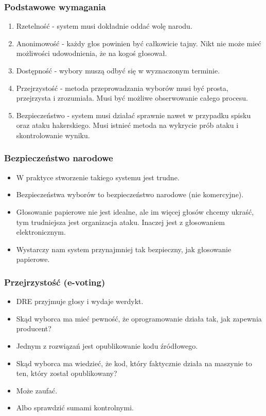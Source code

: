 \documentclass{beamer}
\begin{document}
\begin{frame}
\frametitle{Podstawowe wymagania}\pause
\begin{enumerate}
\item Rzetelność - system musi dokładnie oddać wolę narodu.\pause
\item Anonimowość - każdy głos powinien być całkowicie tajny. Nikt nie może mieć możliwości udowodnienia, że na kogoś głosował.\pause
\item Dostępność - wybory muszą odbyć się w wyznaczonym terminie.\pause
\item Przejrzystość - metoda przeprowadzania wyborów musi być prosta, przejrzysta i zrozumiała. Musi być możliwe obserwowanie całego procesu.\pause
\item Bezpieczeństwo - system musi działać sprawnie nawet w przypadku spisku oraz ataku hakerskiego. Musi istnieć metoda na wykrycie prób ataku i skontrolowanie wyniku.
\end{enumerate}
\end{frame}

\begin{frame}
\frametitle{Bezpieczeństwo narodowe}
\begin{itemize}
\item W praktyce stworzenie takiego systemu jest trudne.\pause
\item Bezpieczeństwa wyborów to bezpieczeństwo narodowe (nie komercyjne).\pause
\item Głosowanie papierowe nie jest idealne, ale im więcej głosów chcemy ukraść, tym trudniejsza jest organizacja ataku. Inaczej jest z głosowaniem elektronicznym.\pause
\item Wystarczy nam system przynajmniej tak bezpieczny, jak głosowanie papierowe.
\end{itemize}
\end{frame}

\begin{frame}
\frametitle{Przejrzystość (e-voting)}\pause
\begin{itemize}
\item DRE przyjmuje głosy i wydaje werdykt.\pause
\item Skąd wyborca ma mieć pewność, że oprogramowanie działa tak, jak zapewnia producent?\pause
\item Jednym z rozwiązań jest opublikowanie kodu źródłowego.\pause
\item Skąd wyborca ma wiedzieć, że kod, który faktycznie działa na maszynie to ten, który został opublikowany?\pause
\item Może zaufać.\pause
\item Albo sprawdzić sumami kontrolnymi.
\end{itemize}
\end{frame}
\end{document}
